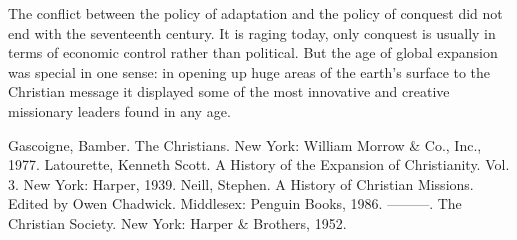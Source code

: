 The conflict between the policy of adaptation and the policy of conquest did not end with the
seventeenth century. It is raging today, only conquest is usually in terms of economic control
rather than political. But the age of global expansion was special in one sense: in opening up huge
areas of the earth’s surface to the Christian message it displayed some of the most innovative and
creative missionary leaders found in any age.

\begin{readinglist}
\entry Gascoigne, Bamber. The Christians. New York: William Morrow \& Co., Inc., 1977.
\entry Latourette, Kenneth Scott. A History of the Expansion of Christianity. Vol. 3. New York:
  Harper, 1939.
\entry Neill, Stephen. A History of Christian Missions. Edited by Owen Chadwick. Middlesex: Penguin
  Books, 1986.
\entry ———. The Christian Society. New York: Harper \& Brothers, 1952.
\end{readinglist}
